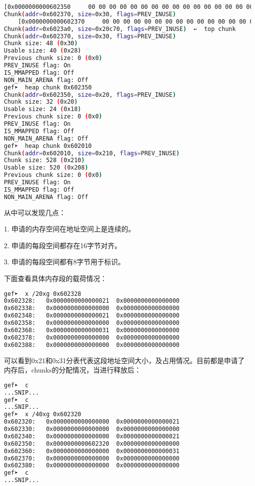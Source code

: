 \documentclass[12pt]{article}  %
\begin{document}
\begin{lstlisting}[language=sh]
    [0x0000000000602350     00 00 00 00 00 00 00 00 00 00 00 00 00 00 00 00     ................]
Chunk(addr=0x602370, size=0x30, flags=PREV_INUSE)
    [0x0000000000602370     00 00 00 00 00 00 00 00 00 00 00 00 00 00 00 00     ................]
Chunk(addr=0x6023a0, size=0x20c70, flags=PREV_INUSE)  ←  top chunk
Chunk(addr=0x602370, size=0x30, flags=PREV_INUSE)
Chunk size: 48 (0x30)
Usable size: 40 (0x28)
Previous chunk size: 0 (0x0)
PREV_INUSE flag: On
IS_MMAPPED flag: Off
NON_MAIN_ARENA flag: Off
gef➤  heap chunk 0x602350
Chunk(addr=0x602350, size=0x20, flags=PREV_INUSE)
Chunk size: 32 (0x20)
Usable size: 24 (0x18)
Previous chunk size: 0 (0x0)
PREV_INUSE flag: On
IS_MMAPPED flag: Off
NON_MAIN_ARENA flag: Off
gef➤  heap chunk 0x602010
Chunk(addr=0x602010, size=0x210, flags=PREV_INUSE)
Chunk size: 528 (0x210)
Usable size: 520 (0x208)
Previous chunk size: 0 (0x0)
PREV_INUSE flag: On
IS_MMAPPED flag: Off
NON_MAIN_ARENA flag: Off
\end{lstlisting}\par
从中可以发现几点：\par
1. 申请的内存空间在地址空间上是连续的。\par
2. 申请的每段空间都存在16字节对齐。\par
3. 申请的每段空间都有8字节用于标识。\par
下面查看具体内存段的载荷情况：
\begin{lstlisting}[language=sh]
gef➤  x /20xg 0x602328
0x602328:	0x0000000000000021	0x0000000000000000
0x602338:	0x0000000000000000	0x0000000000000000
0x602348:	0x0000000000000021	0x0000000000000000
0x602358:	0x0000000000000000	0x0000000000000000
0x602368:	0x0000000000000031	0x0000000000000000
0x602378:	0x0000000000000000	0x0000000000000000
0x602388:	0x0000000000000000	0x0000000000000000
\end{lstlisting}\par
可以看到0x21和0x31分表代表这段地址空间大小，及占用情况。目前都是申请了内存后，chunks的分配情况，当进行释放后：
\begin{lstlisting}[language=sh]
gef➤  c
...SNIP...
gef➤  c
...SNIP...
gef➤  x /40xg 0x602320
0x602320:	0x0000000000000000	0x0000000000000021
0x602330:	0x0000000000000000	0x0000000000000000
0x602340:	0x0000000000000000	0x0000000000000021
0x602350:	0x0000000000602320	0x0000000000000000
0x602360:	0x0000000000000000	0x0000000000000031
0x602370:	0x0000000000000000	0x0000000000000000
0x602380:	0x0000000000000000	0x0000000000000000
gef➤  c
...SNIP...
\end{lstlisting}\par
\end{document}
